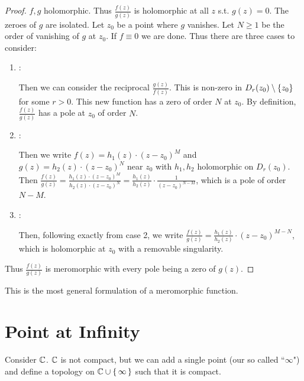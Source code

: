 \begin{proof}
$f,g$ holomorphic. Thus $\frac{f(z)}{g(z)}$ is holomorphic at all $z$ s.t. $g(z) = 0$. The zeroes of $g$ are isolated. Let $z_0$ be a point where $g$ vanishes. Let $N \geq 1$ be the order of vanishing of $g$ at $z_0$. If $f\equiv 0$ we are done. Thus there are three cases to consider:

\begin{enumerate}
    \item {}:
    
    Then we can consider the reciprocal $\frac{g(z)}{f(z)}$. This is non-zero in $D_r (z_0) \setminus \{ z_0 \}$ for some $r>0$. This new function has a zero of order $N$ at $z_0$. By definition, $\frac{f(z)}{g(z)}$ has a pole at $z_0$ of order $N$.
    
    \item {}:
    
    Then we write $f(z) = h_1(z) \cdot (z-z_0)^M$ and $g(z) = h_2(z) \cdot (z-z_0)^N$ near $z_0$ with $h_1,h_2$ holomorphic on $D_r(z_0)$. Then $\frac{f(z)}{g(z)} = \frac{h_1(z) \cdot (z-z_0)^M}{h_2(z) \cdot (z-z_0)^N} = \frac{h_1(z)}{h_2(z)} \cdot \frac{1}{(z-z_0)^{N-M}}$, which is a pole of order $N-M$.
    
    \item {}:
    
    Then, following exactly from case 2, we write $\frac{f(z)}{g(z)} = \frac{h_1(z)}{h_2(z)} \cdot (z-z_0)^{M-N}$, which is holomorphic at $z_0$ with a removable singularity.
    
\end{enumerate}


Thus $\frac{f(z)}{g(z)}$ is meromorphic with every pole being a zero of $g(z)$.
\end{proof}

\begin{note}
    This is the most general formulation of a meromorphic function.
\end{note}

\section{Point at Infinity}

Consider $\mathbb{C}$. $\mathbb{C}$ is not compact, but we can add a single point (our so called ``$\infty$") and define a topology on $\mathbb{C} \cup \set{ \infty }$ such that it is compact.


